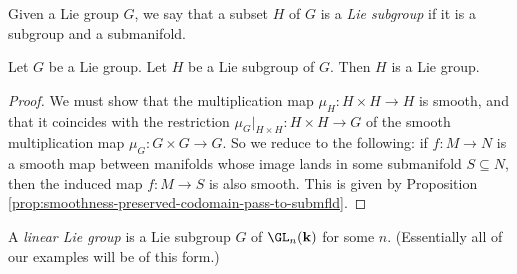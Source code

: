 \documentclass[reqno]{amsart} 
\begin{document}
\begin{definition}
  Given a Lie group $G$,
  we say that a subset $H$ of $G$ is a \emph{Lie subgroup}
  if it is a subgroup and a submanifold.
\end{definition}
\begin{lemma}
  Let $G$ be a Lie group.
  Let $H$ be a Lie subgroup of $G$.
  Then $H$ is a Lie group.
\end{lemma}
\begin{proof}
  We must show that the multiplication map
  $\mu_H : H \times H \rightarrow H$ is smooth,
  and that it coincides
  with the restriction
  $\mu_G|_{H \times H} : H \times H \rightarrow G$
  of the smooth multiplication map $\mu_G : G \times G \rightarrow
  G$.
  So we reduce to the following:
  if $f : M \rightarrow N$
  is a smooth map between manifolds
  whose image lands in
  some submanifold $S \subseteq N$,
  then the induced map $f : M \rightarrow S$
  is also smooth.
  This is given by Proposition \ref{prop:smoothness-preserved-codomain-pass-to-submfld}.
\end{proof}

\begin{definition}
A \emph{linear Lie group}
is a Lie subgroup $G$ of $\GL_n(\mathbf{k})$ for some $n$.
(Essentially all of our examples will be of this form.)
\end{definition}
\end{document}
